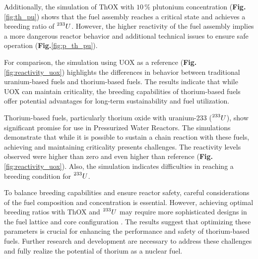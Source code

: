 Additionally, the simulation of ThOX with \(10 \, \%\) plutonium concentration (\textbf{Fig.}\ref{fig:th_pu}) shows that the fuel assembly reaches a critical state and achieves a breeding ratio of \(\prescript{233}{}{U}\). However, the higher reactivity of the fuel assembly implies a more dangerous reactor behavior and additional technical issues to ensure safe operation (\textbf{Fig.}\ref{fig:p_th_pu}).

For comparison, the simulation using UOX as a reference (\textbf{Fig.} \ref{fig:reactivity_uox}) highlights the differences in behavior between traditional uranium-based fuels and thorium-based fuels. The results indicate that while UOX can maintain criticality, the breeding capabilities of thorium-based fuels offer potential advantages for long-term sustainability and fuel utilization.

Thorium-based fuels, particularly thorium oxide with uranium-233 (\(\prescript{233}{}{U}\)), show significant promise for use in Pressurized Water Reactors. The simulations demonstrate that while it is possible to sustain a chain reaction with these fuels, achieving and maintaining criticality presents challenges. The reactivity levels observed were higher than zero and even higher than reference (\textbf{Fig.} \ref{fig:reactivity_uox}). Also, the simulation indicates difficulties in reaching a breeding condition for \(\prescript{233}{}{U}\).

\vspace{90pt}

To balance breeding capabilities and ensure reactor safety, careful considerations of the fuel composition and concentration is essential. However, achieving optimal breeding ratios with ThOX and \(\prescript{233}{}{U}\) may require more sophisticated designs in the fuel lattice and core configuration \cite{roadmap}. The results suggest that optimizing these parameters is crucial for enhancing the performance and safety of thorium-based fuels. Further research and development are necessary to address these challenges and fully realize the potential of thorium as a nuclear fuel.